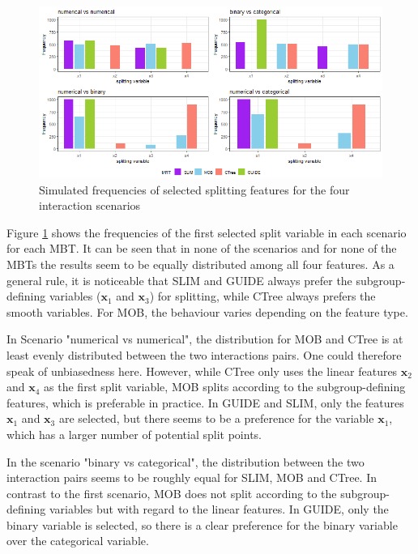 \begin{figure}[!htb]
    \centering   
    \includegraphics[width = 16cm]{Figures/simulations/batchtools/selection_bias_general/interactions.png}
    \caption{Simulated frequencies of selected splitting features for the four interaction scenarios}
    \label{fig:selection_bias_interactions}
\end{figure}

Figure \ref{fig:selection_bias_interactions} shows the frequencies of the first selected split variable in each scenario for each MBT. It can be seen that in none of the scenarios and for none of the MBTs the results seem to be equally distributed among all four features. 
As a general rule, it is noticeable that SLIM and GUIDE always prefer the subgroup-defining variables ($\textbf{x}_1$  and $\textbf{x}_3$) for splitting, while CTree always prefers the smooth variables. For MOB, the behaviour varies depending on the feature type.

In Scenario "numerical vs numerical", the distribution for MOB and CTree is at least evenly distributed between the two interactions pairs. One could therefore speak of unbiasedness here. However, while CTree only uses the linear features $\textbf{x}_2$ and $\textbf{x}_4$ as the first split variable, MOB splits according to the subgroup-defining features, which is preferable in practice.
In GUIDE and SLIM, only the features $\textbf{x}_1$ and $\textbf{x}_3$ are selected, but there seems to be a preference for the variable $\textbf{x}_1$, which has a larger number of potential split points.


In the scenario "binary vs categorical", the distribution between the two interaction pairs seems to be roughly equal for SLIM, MOB and CTree. In contrast to the first scenario, MOB does not split according to the subgroup-defining variables but with regard to the linear features.
In GUIDE, only the binary variable is selected, so there is a clear preference for the binary variable over the categorical variable.

